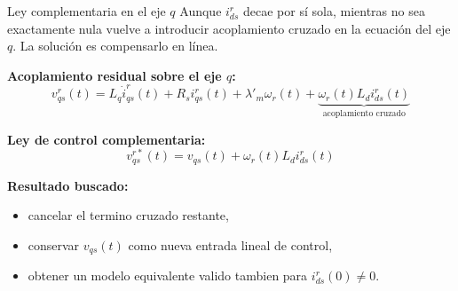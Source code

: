 \documentclass[aspectratio=169,t]{beamer}
\begin{document}
\begin{frame}{Ley complementaria en el eje $q$}
{\small\color{uncGray}Aunque $i_{ds}^{r}$ decae por sí sola, mientras no sea exactamente nula vuelve a introducir acoplamiento cruzado en la ecuación del eje $q$. La solución es compensarlo en línea.}\par
\vspace{3mm}

\textbf{Acoplamiento residual sobre el eje $q$:}
\begin{equation*}
v_{qs}^{r}(t)=L_q\dot{i}_{qs}^{r}(t)+R_s i_{qs}^{r}(t)+\lambda'_m\omega_r(t)+
\underbrace{\omega_r(t)L_d i_{ds}^{r}(t)}_{\text{acoplamiento cruzado}}
\end{equation*}

\textbf{Ley de control complementaria:}
\begin{equation*}
\boxed{\;v_{qs}^{r*}(t)=v_{qs}(t)+\omega_r(t)L_d i_{ds}^{r}(t)\;}
\end{equation*}

\textbf{Resultado buscado:}
\begin{itemize}
  \item cancelar el termino cruzado restante,
  \item conservar $v_{qs}(t)$ como nueva entrada lineal de control,
  \item obtener un modelo equivalente valido tambien para $i_{ds}^{r}(0)\neq 0$.
\end{itemize}
\end{frame}
\end{document}
